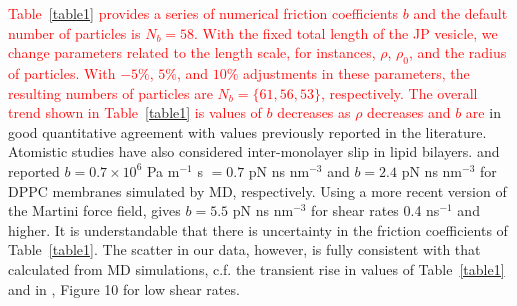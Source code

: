 \documentclass[lineno]{jfm}
\newcommand{\ReviewerOne}[1]{\textcolor{red}{#1}}
\begin{document}
\ReviewerOne{Table~\ref{table1} provides a series of numerical friction coefficients $b$ and the default number of particles is $N_b = 58$. With the fixed total length of the JP vesicle, we change parameters related to the length scale, for instances, $\rho$, $\rho_0$, and the radius of particles.
With $-5\%$, $5\%$, and $10\%$ adjustments in these parameters, the resulting numbers of particles are $N_b=\{61,56,53\}$, respectively. }
%
\ReviewerOne{The overall trend shown in Table~\ref{table1} is values of $b$ decreases as $\rho$
decreases and $b$ are}
in good quantitative agreement with values previously reported in the literature.
Atomistic studies have also considered inter-monolayer slip in lipid bilayers. 
\cite{WuoEd06} and \cite{denOtter2007} reported $b = 0.7 \times 10^6$ Pa m$^{-1}$ s  
$=0.7$ pN ns nm$^{-3}$  
and $b = 2.4$  pN ns nm$^{-3}$ for DPPC membranes simulated by MD, respectively. 
Using a more recent version of the Martini force field, \cite{Zgorski2019} 
gives $b = 5.5$ pN ns nm$^{-3}$ for shear rates 0.4 ns$^{-1}$ and higher.
It is understandable that there is uncertainty in the friction coefficients of
Table~\ref{table1}.  The scatter in our data, however, is fully consistent with that calculated
from MD simulations, c.f. the transient rise in values of Table~\ref{table1} and in \cite{Zgorski2019}, Figure 10
for low shear rates. 
\end{document}
